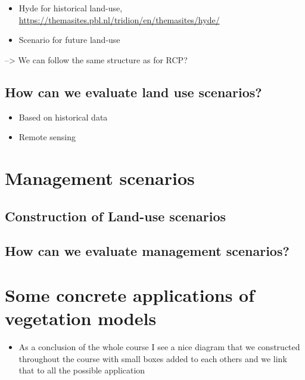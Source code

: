 \documentclass[12pt,oneside]{book}
\providecommand{\tightlist}{%
  \setlength{\itemsep}{0pt}\setlength{\parskip}{0pt}}
\begin{document}
\begin{itemize}
\tightlist
\item
  Hyde for historical land-use,
  \url{https://themasites.pbl.nl/tridion/en/themasites/hyde/}
\item
  Scenario for future land-use
\end{itemize}

--\textgreater{} We can follow the same structure as for RCP?

\subsection{How can we evaluate land use
scenarios?}\label{how-can-we-evaluate-land-use-scenarios}

\begin{itemize}
\tightlist
\item
  Based on historical data
\item
  Remote sensing
\end{itemize}

\section{Management scenarios}\label{management-scenarios}

\subsection{Construction of Land-use
scenarios}\label{construction-of-land-use-scenarios-1}

\subsection{How can we evaluate management
scenarios?}\label{how-can-we-evaluate-management-scenarios}

\section{Some concrete applications of vegetation
models}\label{some-concrete-applications-of-vegetation-models}

\begin{itemize}
\tightlist
\item
  As a conclusion of the whole course I see a nice diagram that we
  constructed throughout the course with small boxes added to each
  others and we link that to all the possible application
\end{itemize}
\end{document}
